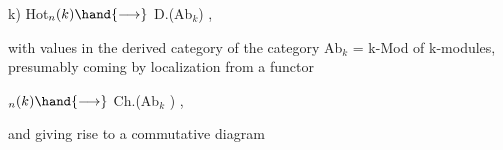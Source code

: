 \hand{(}k) \qquad Hot$_n(k) \hand{\longrightarrow}$ D.(Ab$_k$) \quad ,

with values in the derived category of the category Ab$_k$ = k-Mod of
k-modules, presumably coming by localization from a functor

 \qquad {}$_n(k) \hand{\longrightarrow}$ Ch.(Ab$_k$ ) \quad ,

and giving rise to a commutative diagram 


